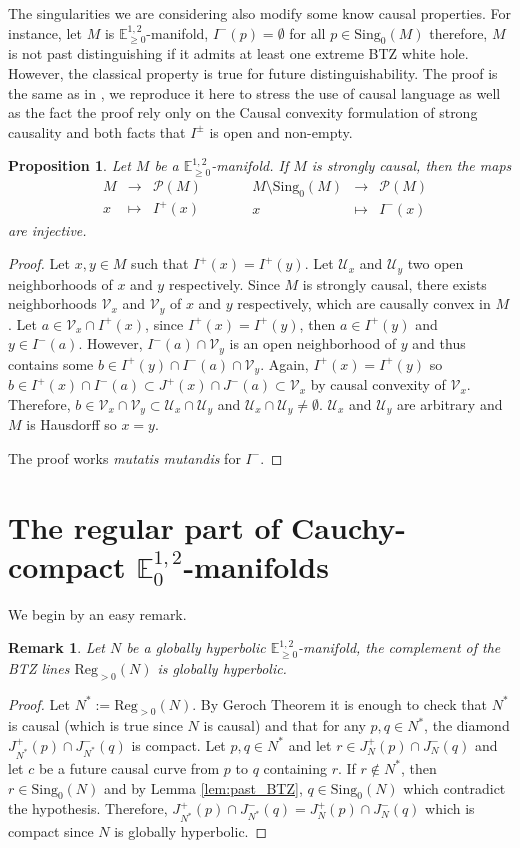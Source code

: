 \documentclass[a4paper,12pt]{article}
\def\U{\mathcal U}
\def\V{\mathcal V}
\def\sing{\mathrm{Sing}}
\newcommand{\mass}[1]{{\mathbb E}^{1,2}_{#1}}
\def\Reg{\mathrm{Reg}}
\def\reg{\Reg}
\newcommand{\fonctionn}[4]{\displaystyle\begin{array}{l|rcl}
& \displaystyle #1 & \longrightarrow & \displaystyle #2 \\
    & \displaystyle #3 & \longmapsto & \displaystyle #4 \end{array}}
\newtheorem{propou}[lemou]{Proposition}
\newtheorem{remark}{Remark}             %
\begin{document}
The singularities we are considering also modify some know causal properties. For instance, let $M$ is $\mass{\geq0}$-manifold, $I^-(p)=\emptyset$ for all $p\in \sing_0(M)$  therefore, $M$ is not past distinguishing if it admits at least one extreme BTZ white hole. However, the classical property is true for future distinguishability.  The proof is the same as in \cite{MR0469146}, we reproduce it here to stress the use of causal language as well as the fact the proof rely only on the Causal convexity formulation of strong causality and both facts that $I^{\pm}$ is open and non-empty. 


			\begin{propou}\label{btzprop:FZenon_injectif} \label{prop:FZenon_injectif}Let $M$ be a $\mass{\geq0}$-manifold. If $M$ is strongly causal, then
			the maps $$\fonctionn{M}{\mathcal{P}(M)}{x}{I^+(x)}\quad \quad \fonctionn{M\setminus\sing_0(M)}{\mathcal{P}(M)}{x}{I^-(x)}$$
			are injective.
			\end{propou}
			\begin{proof}
			Let $x,y\in M$ such that $I^+(x)= I^+(y)$. Let $\U_x$ and $\U_y$ two open neighborhoods of $x$ and $y$ respectively. Since $M$ is strongly causal, there exists neighborhoods $\V_x$ and $\V_y$ of $x$ and $y$ respectively, which are causally convex in $M$. Let $a\in \V_x\cap I^+(x)$, since $I^+(x)=I^+(y)$, then $a\in I^+(y)$ and $y\in I^-(a)$. However, $I^-(a)\cap \V_y$ is an open neighborhood of $y$ and thus contains some $b\in I^+(y)\cap I^-(a)\cap \V_y$. 
Again, $I^+(x)=I^+(y)$ so $b\in I^+(x)\cap I^-(a)\subset J^+(x)\cap J^-(a)\subset \V_x$ by causal convexity of $\V_x$. 
Therefore, $b\in \V_x \cap \V_y \subset \U_x\cap \U_y$ and $\U_x\cap \U_y\neq \emptyset$.  
$\U_x$ and $\U_y$ are arbitrary and $M$ is Hausdorff so $x=y$.

The proof works {\it mutatis mutandis} for $I^-$.
			\end{proof}


\section{The regular part of Cauchy-compact $\mass{0}$-manifolds}
\label{sec:reg_BTZ}

 We begin by an easy remark.
 \begin{remark}\label{btzrem:reg_GH}\label{rem:reg_GH} Let $N$ be a globally hyperbolic $\mass{\geq0}$-manifold, the complement of the BTZ lines $\reg_{>0}(N)$ is globally hyperbolic.
 \end{remark}
 \begin{proof} Let $N^*:=\reg_{>0}(N)$.
 By Geroch Theorem it is enough to check that $N^*$ is causal (which is true since $N$ is causal) and that for any $p,q\in N^*$, the diamond $J^+_{N^*}(p)\cap J^-_{N^*}(q)$ is compact.  
 Let $p,q\in N^*$ and let $r\in J^+_{N}(p)\cap J^-_{N}(q)$ and let $c$ be a future causal curve from $p$ to $q$ containing $r$. If $r\notin N^*$, then $r\in \sing_0(N)$ and by Lemma \ref{lem:past_BTZ}, $q\in \sing_0(N)$ which contradict the hypothesis. 
 Therefore, $J^+_{N^*}(p)\cap J^-_{N^*}(q) = J^+_{N}(p)\cap J^-_{N}(q)$ which is compact since $N$ is globally hyperbolic.
 \end{proof}
 
\end{document}
